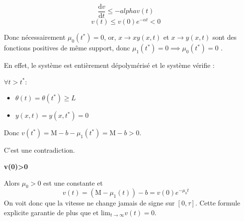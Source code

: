 \documentclass[a4paper]{article}
\newcommand{\mass}{\mathrm{M}}
\newcommand{\dep}{b}
\begin{document}
\begin{preuve}
	\[ \frac{\mathrm{d} v }{\mathrm{d}t} \leq - alpha v(t) \]
	\[ v(t) \leq v(0) e^{-\alpha t} < 0 \]
	
	Donc nécessairement $\mu_0(t^*) = 0$, 
	or, $x \to xy (x,t)$ et $x \to y(x,t)$ sont des fonctions positives de même support,
	donc $\mu_1(t^*) =0 \implies \mu_0(t^*)=0$ .
	
	En effet, le système est entièrement dépolymérisé et le système vérifie :
	
	$\forall t>t^*$:
	\begin{itemize}
		\item $\theta(t)= \theta(t^*) \geq L $
		\item $y(x,t)=y(x,t^*)= 0$
	\end{itemize}
	
	Donc $v(t^*) = \mass - \dep - \mu_1(t^*) = \mass- \dep > 0$.
	
	C'est une contradiction.	
	
	
	\vspace{0.3cm}
	\textbf{v(0)>0}
 	
	Alors $\mu_0>0$ est une constante et 
 	\[ v(t) = ( \mass - \mu_1 (t)) - \dep = v(0)e^{- \mu_0 t} \]
 	On voit donc que la vitesse ne change jamais de signe sur $[0,\tau]$.
	Cette formule explicite garantie de plus que et $\mathrm{lim}_{t \rightarrow \infty} v(t) = 0$.
	
\end{preuve}







\end{document}
